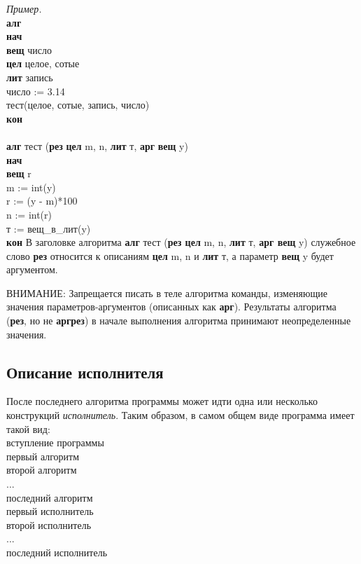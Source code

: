 	\emph{Пример.}\\
{\sffamily
\textbf{алг}\\
\textbf{нач}\\
\otstup \textbf{вещ} число\\
\otstup \textbf{цел} целое, сотые\\
\otstup \textbf{лит} запись\\
\otstup число := 3.14\\
\otstup тест(целое, сотые, запись, число)\\
\textbf{кон}\\
~\\
\textbf{алг} тест (\textbf{рез} \textbf{цел} m, n, \textbf{лит} т, \textbf{арг} \textbf{вещ} y)\\
\textbf{нач}\\
\otstup \textbf{вещ} r\\
\otstup m := int(y)\\
\otstup r := (y - m)*100\\
\otstup n := int(r)\\
\otstup т := вещ\_в\_лит(y)\\
\textbf{кон}
}
В заголовке алгоритма \textsf{\textbf{алг} тест (\textbf{рез цел} m, n, \textbf{лит} т, \textbf{арг вещ} y)} служебное слово \textbf{рез} относится к описаниям \textsf{\textbf{цел} m, n} и \textsf{\textbf{лит} т}, а параметр \textsf{\textbf{вещ} y} будет аргументом.

	ВНИМАНИЕ: Запрещается писать в теле алгоритма команды, изменяющие значения параметров-аргументов (описанных как \textbf{арг}). Результаты алгоритма (\textbf{рез}, но не \textbf{аргрез}) в начале выполнения алгоритма принимают неопределенные значения.


\subsection{Описание исполнителя}
\label{Isps}

После последнего алгоритма программы может идти одна или несколько конструкций \emph{исполнитель}. Таким образом, в самом общем виде программа имеет такой вид:
{\sffamily\\
вступление программы\\
первый алгоритм\\
второй алгоритм\\
...\\
последний алгоритм\\
первый исполнитель\\
второй исполнитель\\
...\\
последний исполнитель
}

